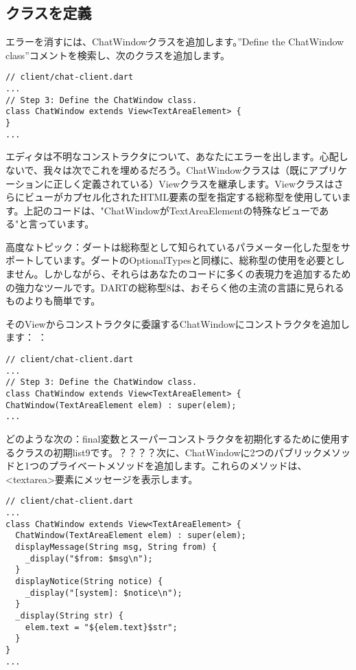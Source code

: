 \subsection{クラスを定義}

エラーを消すには、ChatWindowクラスを追加します。”Define the ChatWindow class”コメントを検索し、次のクラスを追加します。

\begin{verbatim}
// client/chat-client.dart
...
// Step 3: Define the ChatWindow class.
class ChatWindow extends View<TextAreaElement> {
}
...
\end{verbatim}

エディタは不明なコンストラクタについて、あなたにエラーを出します。心配しないで、我々は次でこれを埋めるだろう。ChatWindowクラスは（既にアプリケーションに正しく定義されている）Viewクラスを継承します。Viewクラスはさらにビューがカプセル化されたHTML要素の型を指定する総称型を使用しています。上記のコードは、"ChatWindowがTextAreaElementの特殊なビューである"と言っています。

高度なトピック：ダートは総称型として知られているパラメーター化した型をサポートしています。ダートのOptionalTypesと同様に、総称型の使用を必要としません。しかしながら、それらはあなたのコードに多くの表現力を追加するための強力なツールです。DARTの総称型8は、おそらく他の主流の言語に見られるものよりも簡単です。

そのViewからコンストラクタに委譲するChatWindowにコンストラクタを追加します：
：
\begin{verbatim}
// client/chat-client.dart
...
// Step 3: Define the ChatWindow class.
class ChatWindow extends View<TextAreaElement> {
ChatWindow(TextAreaElement elem) : super(elem);
...
\end{verbatim}

どのような次の：final変数とスーパーコンストラクタを初期化するために使用するクラスの初期list9です。？？？？次に、ChatWindowに2つのパブリックメソッドと1つのプライベートメソッドを追加します。これらのメソッドは、<textarea>要素にメッセージを表示します。


\begin{verbatim}
// client/chat-client.dart
...
class ChatWindow extends View<TextAreaElement> {
  ChatWindow(TextAreaElement elem) : super(elem);
  displayMessage(String msg, String from) {
    _display("$from: $msg\n");
  }
  displayNotice(String notice) {
    _display("[system]: $notice\n");
  }
  _display(String str) {
    elem.text = "${elem.text}$str";
  }
}
...
\end{verbatim}

